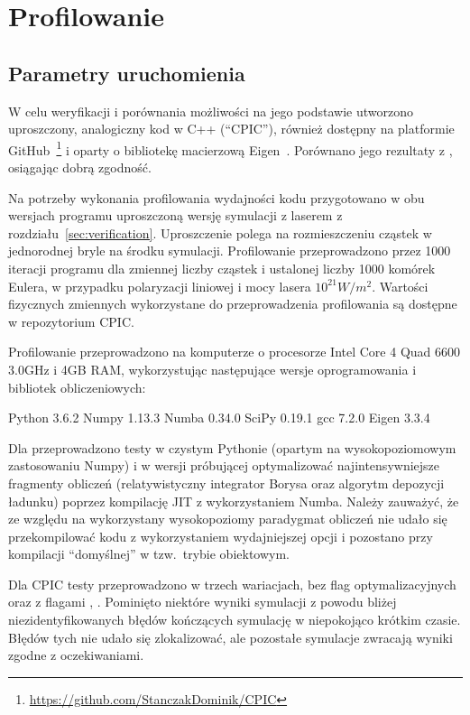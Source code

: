 \section[Profilowanie]{Profilowanie}\label{sec:profiling} 

\subsection{Parametry uruchomienia}

W celu weryfikacji i porównania możliwości \pythonpic{} na jego podstawie
utworzono uproszczony, analogiczny kod w C++ (``CPIC''), również dostępny na platformie
GitHub~\footnote{\url{https://github.com/StanczakDominik/CPIC}} i oparty o bibliotekę macierzową Eigen~\cite{eigen}.
Porównano jego rezultaty z \pythonpic{}, osiągając dobrą zgodność.


Na potrzeby wykonania profilowania wydajności kodu przygotowano w obu wersjach
programu uproszczoną wersję symulacji z laserem z rozdziału~\ref{sec:verification}.
Uproszczenie polega na rozmieszczeniu cząstek w jednorodnej bryle na środku symulacji.
Profilowanie przeprowadzono przez 1000 iteracji programu dla zmiennej liczby cząstek i ustalonej liczby 1000
komórek Eulera, w przypadku polaryzacji liniowej i mocy lasera $10^{21} W/m^2$.
Wartości fizycznych zmiennych wykorzystane do przeprowadzenia profilowania są dostępne w repozytorium CPIC.

Profilowanie przeprowadzono na komputerze o procesorze 
Intel Core 4 Quad 6600 3.0GHz i 4GB RAM, wykorzystując następujące wersje
oprogramowania i bibliotek obliczeniowych:
\begin{itemize}
\itemi{} Python 3.6.2
\itemi{} Numpy 1.13.3
\itemi{} Numba 0.34.0
\itemi{} SciPy 0.19.1
\itemi{} gcc 7.2.0
\itemi{} Eigen 3.3.4
\end{itemize}

Dla \pythonpic{} przeprowadzono testy w czystym Pythonie (opartym na wysokopoziomowym zastosowaniu Numpy)
i w wersji próbującej optymalizować najintensywniejsze fragmenty obliczeń (relatywistyczny integrator Borysa
oraz algorytm depozycji ładunku) poprzez kompilację JIT z wykorzystaniem Numba. Należy zauważyć, że ze względu
na wykorzystany wysokopoziomy paradygmat obliczeń nie udało się przekompilować kodu z wykorzystaniem
wydajniejszej opcji  i pozostano przy kompilacji ``domyślnej'' w tzw.\ trybie obiektowym.

Dla CPIC testy przeprowadzono w trzech wariacjach, bez flag optymalizacyjnych oraz z flagami , .
Pominięto niektóre wyniki symulacji z powodu bliżej niezidentyfikowanych błędów kończących symulację w niepokojąco
krótkim czasie. Błędów tych nie udało się zlokalizować, ale pozostałe symulacje zwracają wyniki zgodne z oczekiwaniami.

